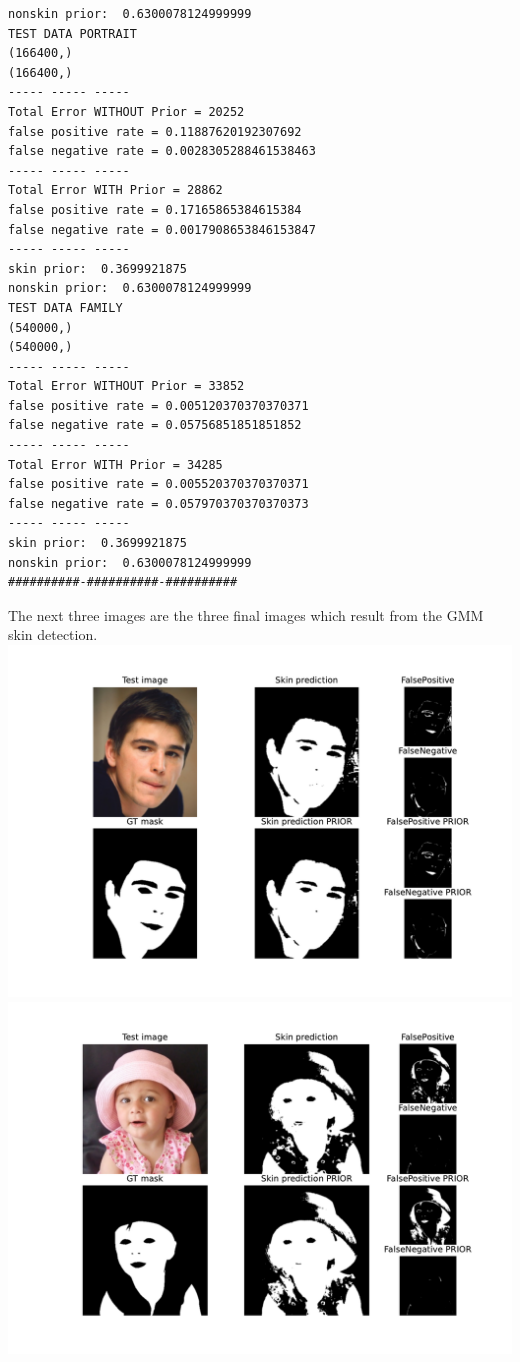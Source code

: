 \documentclass[11pt]{article}
\begin{document}
\begin{enumerate}[1.]
\begin{verbatim}
nonskin prior:  0.6300078124999999
TEST DATA PORTRAIT
(166400,)
(166400,)
----- ----- -----
Total Error WITHOUT Prior = 20252
false positive rate = 0.11887620192307692
false negative rate = 0.0028305288461538463
----- ----- -----
Total Error WITH Prior = 28862
false positive rate = 0.17165865384615384
false negative rate = 0.0017908653846153847
----- ----- -----
skin prior:  0.3699921875
nonskin prior:  0.6300078124999999
TEST DATA FAMILY
(540000,)
(540000,)
----- ----- -----
Total Error WITHOUT Prior = 33852
false positive rate = 0.005120370370370371
false negative rate = 0.05756851851851852
----- ----- -----
Total Error WITH Prior = 34285
false positive rate = 0.005520370370370371
false negative rate = 0.057970370370370373
----- ----- -----
skin prior:  0.3699921875
nonskin prior:  0.6300078124999999
##########-##########-##########

	\end{verbatim}

The next three images are the three final images which result from the GMM skin detection.\\

	\includegraphics[width=6in]{Training-GMM.pdf}\\
	
	\includegraphics[width=6in]{Test-portrait-GMM.pdf}\\


\end{enumerate}
\end{document}
